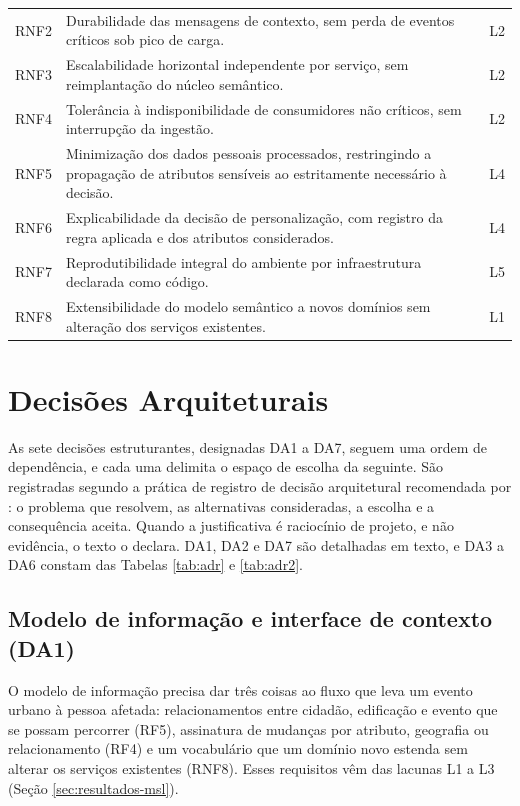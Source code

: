 \begin{table}[H]
\begin{tabularx}{\textwidth}{@{}l X l@{}}
RNF2 & Durabilidade das mensagens de contexto, sem perda de eventos críticos sob pico de carga. & L2 \\
RNF3 & Escalabilidade horizontal independente por serviço, sem reimplantação do núcleo semântico. & L2 \\
RNF4 & Tolerância à indisponibilidade de consumidores não críticos, sem interrupção da ingestão. & L2 \\
RNF5 & Minimização dos dados pessoais processados, restringindo a propagação de atributos sensíveis ao estritamente necessário à decisão. & L4 \\
RNF6 & Explicabilidade da decisão de personalização, com registro da regra aplicada e dos atributos considerados. & L4 \\
RNF7 & Reprodutibilidade integral do ambiente por infraestrutura declarada como código. & L5 \\
RNF8 & Extensibilidade do modelo semântico a novos domínios sem alteração dos serviços existentes. & L1 \\
\bottomrule
\end{tabularx}
\end{table}

\section{Decisões Arquiteturais}
\label{sec:adr}

As sete decisões estruturantes, designadas DA1 a DA7, seguem uma ordem de dependência, e cada uma delimita o espaço de escolha da seguinte. São registradas segundo a prática de registro de decisão arquitetural recomendada por : o problema que resolvem, as alternativas consideradas, a escolha e a consequência aceita. Quando a justificativa é raciocínio de projeto, e não evidência, o texto o declara. DA1, DA2 e DA7 são detalhadas em texto, e DA3 a DA6 constam das Tabelas \ref{tab:adr} e \ref{tab:adr2}.

\subsection{Modelo de informação e interface de contexto (DA1)}

O modelo de informação precisa dar três coisas ao fluxo que leva um evento urbano à pessoa afetada: relacionamentos entre cidadão, edificação e evento que se possam percorrer (RF5), assinatura de mudanças por atributo, geografia ou relacionamento (RF4) e um vocabulário que um domínio novo estenda sem alterar os serviços existentes (RNF8). Esses requisitos vêm das lacunas L1 a L3 (Seção \ref{sec:resultados-msl}).


